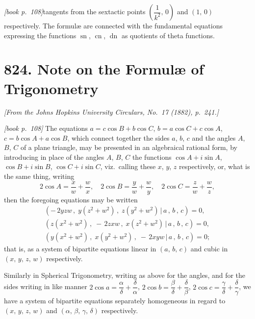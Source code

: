 \documentclass[11pt,a4paper]{article}
\theoremstyle{plain}
\theoremstyle{definition}
\theoremstyle{remark}
\DeclareMathOperator{\sn}{sn}
\DeclareMathOperator{\cn}{cn}
\DeclareMathOperator{\dn}{dn}
\begin{document}
\bigskip

\noindent\textit{[book p.~108]}\quad tangents from the sextactic points $\left(\dfrac{1}{k^2},\,0\right)$ and $(1,\,0)$ respectively. The formul\ae{} are connected with the fundamental equations expressing the functions $\sn$, $\cn$, $\dn$ as quotients of theta functions.

\section*{824. Note on the Formul\ae{} of Trigonometry}

\begin{center}
\textit{[From the Johns Hopkins University Circulars, No.\ 17 (1882), p.~241.]}
\end{center}

\noindent\textit{[book p.~108]} The equations $a = c\cos B + b\cos C$, $b = a\cos C + c\cos A$, $c = b\cos A + a\cos B$, which connect together the sides $a$, $b$, $c$ and the angles $A$, $B$, $C$ of a plane triangle, may be presented in an algebraical rational form, by introducing in place of the angles $A$, $B$, $C$ the functions $\cos A + i\sin A$, $\cos B + i\sin B$, $\cos C + i\sin C$, viz.\ calling these $x$, $y$, $z$ respectively, or, what is the same thing, writing
\[
2\cos A = \frac{x}{w} + \frac{w}{x},\quad
2\cos B = \frac{y}{w} + \frac{w}{y},\quad
2\cos C = \frac{z}{w} + \frac{w}{z},
\]
then the foregoing equations may be written
\begin{gather*}
(-\,2yzw\,,\;y(z^2 + w^2)\,,\;z(y^2 + w^2)\,|\,a\,,\,b\,,\,c) = 0,\\
(z(x^2 + w^2)\,,\;-\,2zxw\,,\;x(z^2 + w^2)\,|\,a\,,\,b\,,\,c) = 0,\\
(y(x^2 + w^2)\,,\;x(y^2 + w^2)\,,\;-\,2xyw\,|\,a\,,\,b\,,\,c) = 0;
\end{gather*}
that is, as a system of bipartite equations linear in $(a,\,b,\,c)$ and cubic in $(x,\,y,\,z,\,w)$ respectively.

Similarly in Spherical Trigonometry, writing as above for the angles, and for the sides writing in like manner $2\cos a = \dfrac{\alpha}{\delta} + \dfrac{\delta}{\alpha}$, $2\cos b = \dfrac{\beta}{\delta} + \dfrac{\delta}{\beta}$, $2\cos c = \dfrac{\gamma}{\delta} + \dfrac{\delta}{\gamma}$, we have a system of bipartite equations separately homogeneous in regard to $(x,\,y,\,z,\,w)$ and $(\alpha,\,\beta,\,\gamma,\,\delta)$ respectively.
\end{document}
